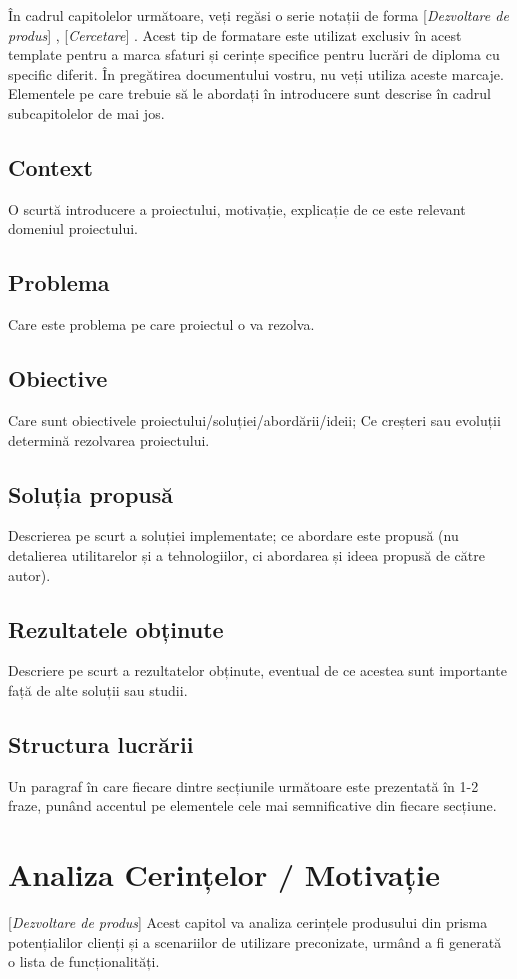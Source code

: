 \documentclass[12pt,a4paper]{report}
\newcommand{\worktype}[1]{[\textit{#1}] }
\newcommand{\dezvoltare}{\worktype{Dezvoltare de produs}}
\newcommand{\cercetare}{\worktype{Cercetare}}
\begin{document}
În cadrul capitolelor următoare, veți regăsi o serie notații de forma \dezvoltare, \cercetare. Acest tip de formatare este utilizat exclusiv în acest template pentru a marca sfaturi și cerințe specifice pentru lucrări de diploma cu specific diferit. În pregătirea documentului vostru, nu veți utiliza aceste marcaje. 
Elementele pe care trebuie să le abordați în introducere sunt descrise în cadrul subcapitolelor de mai jos. 
\section{Context}
O scurtă introducere a proiectului, motivație, explicație de ce este relevant domeniul proiectului.
\section{Problema} 
Care este problema pe care proiectul o va rezolva.
\section{Obiective}
Care sunt obiectivele proiectului/soluției/abordării/ideii; Ce creșteri sau evoluții determină rezolvarea proiectului.
\section{Soluția propusă} 
Descrierea pe scurt a soluției implementate; ce abordare este propusă (nu detalierea utilitarelor și a tehnologiilor, ci abordarea și ideea propusă de către autor).
\section{Rezultatele obținute}
Descriere pe scurt a rezultatelor obținute, eventual de ce acestea sunt importante față de alte soluții sau studii.
\section{Structura lucrării}
Un paragraf în care fiecare dintre secțiunile următoare este prezentată în 1-2 fraze, punând accentul pe elementele cele mai semnificative din fiecare secțiune.



\chapter{Analiza Cerințelor / Motivație}
\dezvoltare Acest capitol va analiza cerințele produsului din prisma potențialilor clienți și a scenariilor de utilizare preconizate, urmând a fi generată o lista de funcționalități. 
\end{document}

